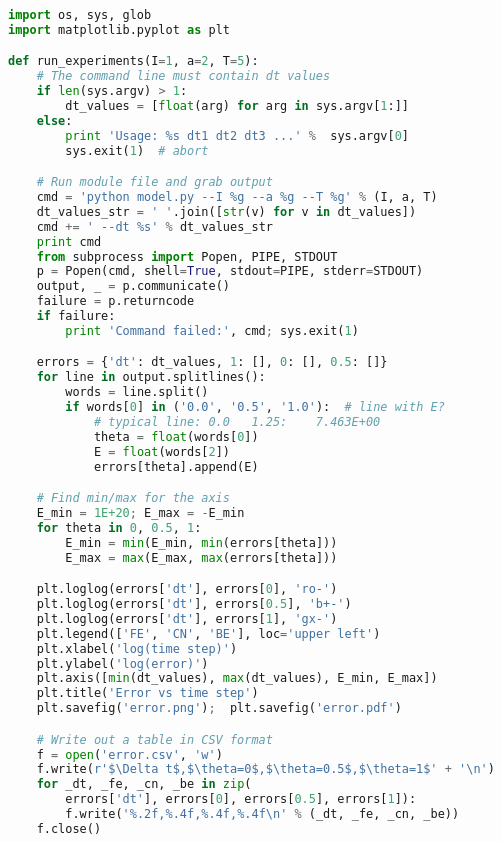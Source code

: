 \documentclass[graybox,sectrefs,envcountresetchap,open=right,final]{svmonodo}
\begin{document}
\begin{lstlisting}[language=python,style=blue1bar_bluegreen]
import os, sys, glob
import matplotlib.pyplot as plt

def run_experiments(I=1, a=2, T=5):
    # The command line must contain dt values
    if len(sys.argv) > 1:
        dt_values = [float(arg) for arg in sys.argv[1:]]
    else:
        print 'Usage: %s dt1 dt2 dt3 ...' %  sys.argv[0]
        sys.exit(1)  # abort

    # Run module file and grab output
    cmd = 'python model.py --I %g --a %g --T %g' % (I, a, T)
    dt_values_str = ' '.join([str(v) for v in dt_values])
    cmd += ' --dt %s' % dt_values_str
    print cmd
    from subprocess import Popen, PIPE, STDOUT
    p = Popen(cmd, shell=True, stdout=PIPE, stderr=STDOUT)
    output, _ = p.communicate()
    failure = p.returncode
    if failure:
        print 'Command failed:', cmd; sys.exit(1)

    errors = {'dt': dt_values, 1: [], 0: [], 0.5: []}
    for line in output.splitlines():
        words = line.split()
        if words[0] in ('0.0', '0.5', '1.0'):  # line with E?
            # typical line: 0.0   1.25:    7.463E+00
            theta = float(words[0])
            E = float(words[2])
            errors[theta].append(E)

    # Find min/max for the axis
    E_min = 1E+20; E_max = -E_min
    for theta in 0, 0.5, 1:
        E_min = min(E_min, min(errors[theta]))
        E_max = max(E_max, max(errors[theta]))

    plt.loglog(errors['dt'], errors[0], 'ro-')
    plt.loglog(errors['dt'], errors[0.5], 'b+-')
    plt.loglog(errors['dt'], errors[1], 'gx-')
    plt.legend(['FE', 'CN', 'BE'], loc='upper left')
    plt.xlabel('log(time step)')
    plt.ylabel('log(error)')
    plt.axis([min(dt_values), max(dt_values), E_min, E_max])
    plt.title('Error vs time step')
    plt.savefig('error.png');  plt.savefig('error.pdf')

    # Write out a table in CSV format
    f = open('error.csv', 'w')
    f.write(r'$\Delta t$,$\theta=0$,$\theta=0.5$,$\theta=1$' + '\n')
    for _dt, _fe, _cn, _be in zip(
        errors['dt'], errors[0], errors[0.5], errors[1]):
        f.write('%.2f,%.4f,%.4f,%.4f\n' % (_dt, _fe, _cn, _be))
    f.close()


\end{lstlisting}
\end{document}
